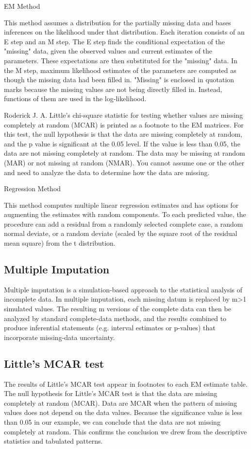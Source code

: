 \documentclass[12pt]{article}
\begin{document}
EM Method

This method assumes a distribution for the partially missing data and bases inferences on the likelihood under that distribution. Each iteration consists of an E step and an M step. The E step finds the conditional expectation of the "missing" data, given the observed values and current estimates of the parameters. These expectations are then substituted for the "missing" data. In the M step, maximum likelihood estimates of the parameters are computed as though the missing data had been filled in. "Missing" is enclosed in quotation marks because the missing values are not being directly filled in. Instead, functions of them are used in the log-likelihood.

Roderick J. A. Little's chi-square statistic for testing whether values are missing completely at random (MCAR) is printed as a footnote to the EM matrices. For this test, the null hypothesis is that the data are missing completely at random, and the p value is significant at the 0.05 level. If the value is less than 0.05, the data are not missing completely at random. The data may be missing at random (MAR) or not missing at random (NMAR). You cannot assume one or the other and need to analyze the data to determine how the data are missing.

Regression Method

This method computes multiple linear regression estimates and has options for augmenting the estimates with random components. To each predicted value, the procedure can add a residual from a randomly selected complete case, a random normal deviate, or a random deviate (scaled by the square root of the residual mean square) from the t distribution.
\subsection{Multiple Imputation}

Multiple imputation is a simulation-based approach to the statistical analysis of incomplete data. In multiple imputation, each missing datum is replaced by m>1 simulated values. The resulting m versions of the complete data can then be analyzed by standard complete-data methods, and the results combined to produce inferential statements (e.g. interval estimates or p-values) that incorporate missing-data uncertainty.

\subsection{Little's MCAR test}
The results of Little’s MCAR test appear in footnotes to each EM estimate table. The null
hypothesis for Little’s MCAR test is that the data are missing completely at random (MCAR).
Data are MCAR when the pattern of missing values does not depend on the data values. Because
the significance value is less than 0.05 in our example, we can conclude that the data are not
missing completely at random. This confirms the conclusion we drew from the descriptive
statistics and tabulated patterns.
\end{document}
